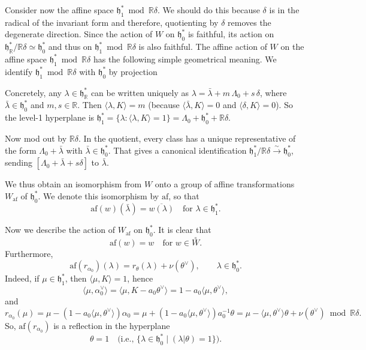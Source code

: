 \documentclass[12pt]{article}
\begin{document}
Consider now the affine space $\mathfrak{h}^*_1 \bmod \mathbb{R}\delta$. We should do this because $\delta$ is in the radical of the invariant form and therefore, quotienting by $\delta$ removes the degenerate direction. Since the action of $W$ on $\mathfrak{h}^*_0$ is faithful, its action on $\mathfrak{h}^*_\mathbb{R}/\mathbb{R}\delta \simeq \mathfrak{h}^*_0$ and thus on $\mathfrak{h}^*_1 \bmod \mathbb{R}\delta$ is also faithful. The affine action of $W$ on the affine space $\mathfrak{h}^*_1 \bmod \mathbb{R}\delta$ has the following simple geometrical meaning. We identify $\mathfrak{h}^*_1 \bmod \mathbb{R}\delta$ with $\mathfrak{h}^*_0$ by projection

Concretely, any $\lambda\in\mathfrak{h}^*_\mathbb{R}$ can be written uniquely as $\lambda = \bar{\lambda} + m\,\Lambda_0 + s\,\delta$, where $\bar{\lambda}\in\mathfrak{h}^*_0$ and $m,s\in\mathbb{R}$. Then $\langle\lambda,K\rangle = m$ (because $\langle\bar\lambda,K\rangle=0$ and $\langle\delta,K\rangle=0$). So the level-1 hyperplane is $\mathfrak{h}^*_1=\{\lambda:\langle\lambda,K\rangle=1\} = \Lambda_0 + \mathfrak{h}^*_0 + \mathbb{R}\delta$. 

Now mod out by $\mathbb{R}\delta$. In the quotient, every class has a unique representative of the form $\Lambda_0+\bar{\lambda}$ with $\bar{\lambda}\in\mathfrak{h}^*_0$. That gives a canonical identification
$\mathfrak{h}^*_1/\mathbb{R}\delta \xrightarrow{\sim} \mathfrak{h}^*_0$, sending $[\Lambda_0+\bar{\lambda}+s\delta]$ to $\bar{\lambda}$.


We thus obtain an isomorphism from $W$ onto a group of affine transformations $W_{\mathrm{af}}$ of $\mathfrak{h}^*_0$. We denote this isomorphism by $\mathrm{af}$, so that
\[
    \mathrm{af}(w)(\bar\lambda) = \overline{w(\lambda)} \quad \text{for } \lambda \in \mathfrak{h}^*_1.
\]

Now we describe the action of $W_{\mathrm{af}}$ on $\mathfrak{h}^*_0$. It is clear that
\begin{equation} \label{6.6.1}
    \mathrm{af}(w) = w \quad \text{for } w \in \overset{\circ}{W}.
\end{equation}
Furthermore,
\begin{equation} \label{6.6.2}
    \mathrm{af}(r_{\alpha_0})(\lambda) = r_\theta(\lambda) + \nu(\theta^\vee), 
    \qquad \lambda \in \mathfrak{h}^*_0.
\end{equation}
Indeed, if $\mu \in \mathfrak{h}^*_1$, then $\langle \mu,K\rangle = 1$, hence
\[
    \langle \mu,\alpha_0^\vee\rangle = \langle \mu, K - a_0\theta^\vee\rangle 
    = 1 - a_0\langle \mu,\theta^\vee\rangle,
\]
and 
\[
    r_{\alpha_0}(\mu) = \mu - (1 - a_0\langle \mu,\theta^\vee\rangle)\alpha_0
    = \mu + (1 - a_0\langle \mu,\theta^\vee\rangle)a_0^{-1}\theta
    = \mu - \langle \mu,\theta^\vee\rangle\theta + \nu(\theta^\vee) \bmod \mathbb{R}\delta.
\]
So, $\mathrm{af}(r_{\alpha_0})$ is a reflection in the hyperplane
\[
    \theta = 1 \quad \text{(i.e., } \{\lambda \in \mathfrak{h}^*_0 \mid (\lambda|\theta)=1\}).
\]
\end{document}
